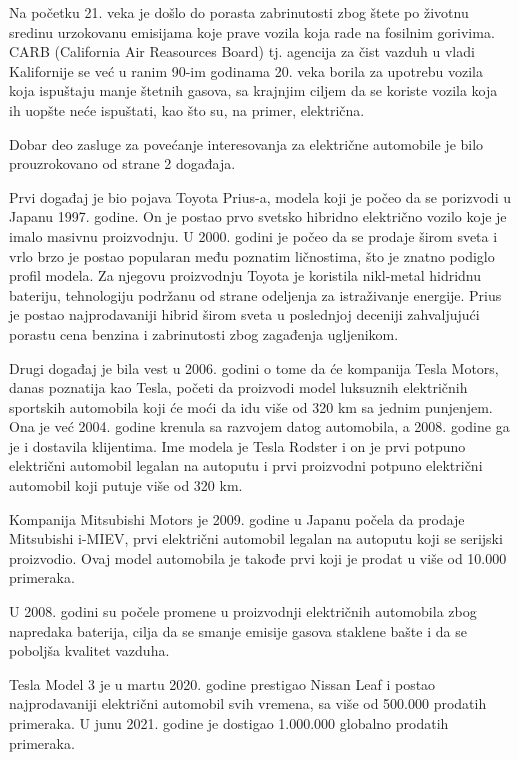 \documentclass[a4paper]{article}
\begin{document}
Na početku 21. veka je došlo do porasta zabrinutosti zbog štete po životnu sredinu urzokovanu emisijama koje prave vozila koja rade na fosilnim gorivima. CARB (California Air Reasources Board) tj. agencija za čist vazduh u vladi Kalifornije se već u ranim 90-im godinama 20. veka borila za upotrebu vozila koja ispuštaju manje štetnih gasova, sa krajnjim ciljem da se koriste vozila koja ih uopšte neće ispuštati, kao što su, na primer, električna.

Dobar deo zasluge za povećanje interesovanja za električne automobile je bilo prouzrokovano od strane 2 događaja.

Prvi događaj je bio pojava Toyota Prius-a, modela koji je počeo da se porizvodi u Japanu 1997. godine. On je postao prvo svetsko hibridno električno vozilo koje je imalo masivnu proizvodnju. U 2000. godini je počeo da se prodaje širom sveta i vrlo brzo je postao popularan među poznatim ličnostima, što je znatno podiglo profil modela. Za njegovu proizvodnju Toyota je koristila nikl-metal hidridnu bateriju, tehnologiju podržanu od strane odeljenja za istraživanje energije. Prius je postao najprodavaniji hibrid širom sveta u poslednjoj deceniji zahvaljujući porastu cena benzina i zabrinutosti zbog zagađenja ugljenikom.

Drugi događaj je bila vest u 2006. godini o tome da će kompanija Tesla Motors, danas poznatija kao Tesla, početi da proizvodi model luksuznih električnih sportskih automobila koji će moći da idu više od 320 km sa jednim punjenjem. Ona je već 2004. godine krenula  sa razvojem datog automobila, a 2008. godine ga je i dostavila klijentima. Ime modela je Tesla Rodster i on je prvi potpuno električni automobil legalan na autoputu i prvi proizvodni potpuno električni automobil koji putuje više od 320 km.

Kompanija Mitsubishi Motors je 2009. godine u Japanu počela da prodaje Mitsubishi i-MIEV, prvi električni automobil legalan na autoputu koji se serijski proizvodio. Ovaj model automobila je takođe prvi koji je prodat u više od 10.000 primeraka.

U 2008. godini su počele promene u proizvodnji električnih automobila zbog napredaka baterija, cilja da se smanje emisije gasova staklene bašte i da se poboljša kvalitet vazduha.

Tesla Model 3 je u martu 2020. godine prestigao Nissan Leaf i postao najprodavaniji električni automobil svih vremena, sa više od 500.000 prodatih primeraka. U junu 2021. godine je dostigao 1.000.000 globalno prodatih primeraka.
\end{document}

